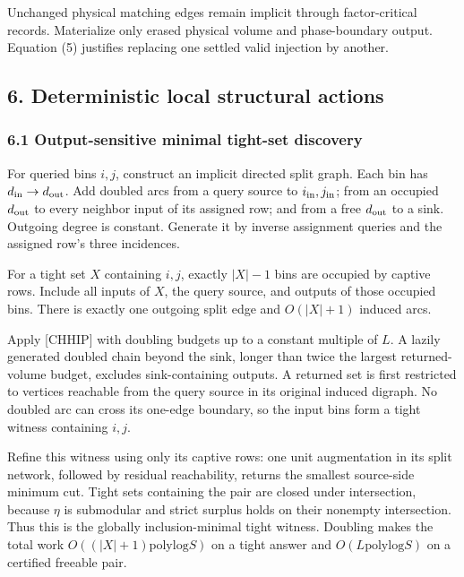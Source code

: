 Unchanged physical matching edges remain implicit through factor-critical records. Materialize only erased physical volume and phase-boundary output. Equation (5) justifies replacing one settled valid injection by another.

\hypertarget{af-46593eb93e-deterministic-local-structural-actions}{%
\subsection{6. Deterministic local structural actions}\label{af-46593eb93e-deterministic-local-structural-actions}}

\hypertarget{af-46593eb93e-output-sensitive-minimal-tight-set-discovery}{%
\subsubsection{6.1 Output-sensitive minimal tight-set discovery}\label{af-46593eb93e-output-sensitive-minimal-tight-set-discovery}}

For queried bins \(i,j\), construct an implicit directed split graph. Each bin has \(d_{\rm in}\to d_{\rm out}\). Add doubled arcs from a query source to \(i_{\rm in},j_{\rm in}\); from an occupied \(d_{\rm out}\) to every neighbor input of its assigned row; and from a free \(d_{\rm out}\) to a sink. Outgoing degree is constant. Generate it by inverse assignment queries and the assigned row's three incidences.

For a tight set \(X\) containing \(i,j\), exactly \(|X|-1\) bins are occupied by captive rows. Include all inputs of \(X\), the query source, and outputs of those occupied bins. There is exactly one outgoing split edge and \(O(|X|+1)\) induced arcs.

Apply {[}CHHIP{]} with doubling budgets up to a constant multiple of \(L\). A lazily generated doubled chain beyond the sink, longer than twice the largest returned-volume budget, excludes sink-containing outputs. A returned set is first restricted to vertices reachable from the query source in its original induced digraph. No doubled arc can cross its one-edge boundary, so the input bins form a tight witness containing \(i,j\).

Refine this witness using only its captive rows: one unit augmentation in its split network, followed by residual reachability, returns the smallest source-side minimum cut. Tight sets containing the pair are closed under intersection, because \(\eta\) is submodular and strict surplus holds on their nonempty intersection. Thus this is the globally inclusion-minimal tight witness. Doubling makes the total work \(O((|X|+1)\mathrm{polylog}S)\) on a tight answer and \(O(L\mathrm{polylog}S)\) on a certified freeable pair.

